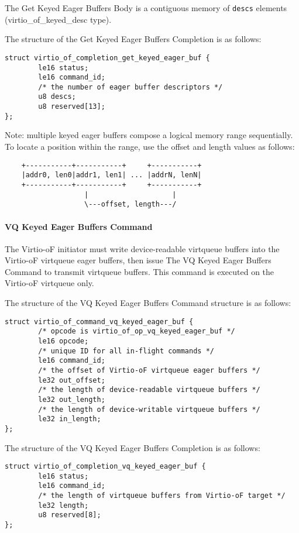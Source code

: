 The Get Keyed Eager Buffers Body is a contiguous memory of \texttt{descs} elements (virtio_of_keyed_desc type).

The structure of the Get Keyed Eager Buffers Completion is as follows:
\begin{lstlisting}
struct virtio_of_completion_get_keyed_eager_buf {
        le16 status;
        le16 command_id;
        /* the number of eager buffer descriptors */
        u8 descs;
        u8 reserved[13];
};
\end{lstlisting}

Note: multiple keyed eager buffers compose a logical memory range sequentially.
To locate a position within the range, use the offset and length values as follows:
\begin{lstlisting}
    +-----------+-----------+     +-----------+
    |addr0, len0|addr1, len1| ... |addrN, lenN|
    +-----------+-----------+     +-----------+
                   |                    |
                   \---offset, length---/
\end{lstlisting}

\paragraph{VQ Keyed Eager Buffers Command}\label{sec:Virtio Transport Options / Virtio Over Fabrics / Commands Definition / Opcodes / VQ Keyed Eager Buffers Command}
The Virtio-oF initiator must write device-readable virtqueue buffers into the Virtio-oF virtqueue eager buffers,
then issue The VQ Keyed Eager Buffers Command to transmit virtqueue buffers.
This command is executed on the Virtio-oF virtqueue only.

The structure of the VQ Keyed Eager Buffers Command structure is as follows:
\begin{lstlisting}
struct virtio_of_command_vq_keyed_eager_buf {
        /* opcode is virtio_of_op_vq_keyed_eager_buf */
        le16 opcode;
        /* unique ID for all in-flight commands */
        le16 command_id;
        /* the offset of Virtio-oF virtqueue eager buffers */
        le32 out_offset;
        /* the length of device-readable virtqueue buffers */
        le32 out_length;
        /* the length of device-writable virtqueue buffers */
        le32 in_length;
};
\end{lstlisting}

The structure of the VQ Keyed Eager Buffers Completion is as follows:
\begin{lstlisting}
struct virtio_of_completion_vq_keyed_eager_buf {
        le16 status;
        le16 command_id;
        /* the length of virtqueue buffers from Virtio-oF target */
        le32 length;
        u8 reserved[8];
};
\end{lstlisting}

